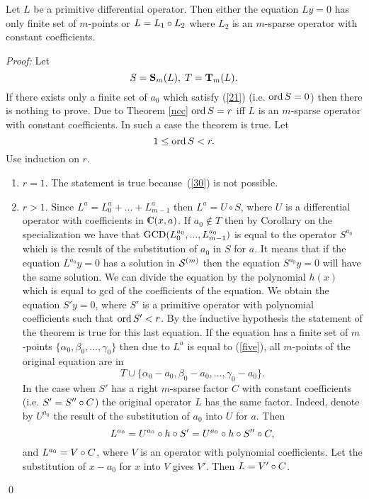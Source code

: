 {{\begin{Theorem}
\label{cfac}
Let $L$ be a primitive
differential operator. Then either the equation
$Ly=0$ has only finite set of $m$-points or $L=L_1\circ L_2$ where
$L_2$ is an $m$-sparse operator with constant coefficients.
\end{Theorem}
{\em Proof:\/}
Let $$S={\bf S}_m(L),\;T={\bf T}_m(L).$$
If there exists only a finite set of
$a_0$ which satisfy (\ref{21})
(i.e. $\mathop{\rm ord} S=0$)
then there is nothing to prove.
Due to Theorem \ref{ncc}
$\mathop{\rm ord} S =r$ iff $L$ is an $m$-sparse operator with constant
coefficients. In such a case the theorem is true. Let
\begin{equation}
\label{30}
1\le \mathop{\rm ord} S < r.
\end{equation}
Use induction on $r$.
\begin{enumerate}
\item $r=1$. The statement is true because~(\ref{30}) is not possible.
\item $r>1$. Since $L^a=L_0^a+...+L_{m-1}^a$ then $L^a = U\circ S$,
where $U$ is a differential operator with coefficients
in $\complex (x,a)$.
If
$a_0 \notin  T$
then by Corollary on the specialization we have that
$\mathop{\rm GCD}(L_0^{a_0},...,L_{m-1}^{a_0})$
is equal to the operator $S^{a_0}$ which is the result of the
substitution of $a_0$ in $S$ for $a$. It means that if the equation
$L^{a_0}y=0$ has a solution in ${\cal S} ^{(m)}$ then the equation
$S^{a_0}y=0$ will have the same solution.  We can
divide the equation by the polynomial $h(x)$ which is equal to gcd
of the coefficients of the equation. We obtain the equation $S'y=0$,
where $S'$ is a primitive operator
with polynomial coefficients
such that $\mathop{\rm ord} S'<r$.  By the inductive hypothesis the statement
of the theorem is true for this last equation.  If the equation has a
finite set of $m$-points $\{\alpha _0,\beta _0,...,\gamma _0\}$ then 
due to $L^a$ is equal to (\ref{five}), all $m$-points of the original 
equation are in
\begin{equation}
\label{31}
T \cup \{\alpha _0-a_0,\beta _0-a_0,...,\gamma _0-a_0\}.
\end{equation}
In the case when $S'$ has a right $m$-sparse factor $C$ with constant
coefficients (i.e. $S'=S''\circ C$) the original operator $L$ has
the same factor.  Indeed, denote by $U^{a_0}$ the result of the
substitution of $a_0$ into $U$ for $a$. Then
$$ L^{a_0}=U^{a_0}\circ h \circ S'= U^{a_0}\circ
h \circ S''\circ C, $$
and $L^{a_0}=V\circ C$, where $V$ is an operator with polynomial
coefficients.  Let the substitution of $x-a_0$ for $x$ into $V$ gives
$V'$. Then $L=V'\circ C$.
\end{enumerate} \qed

}}
